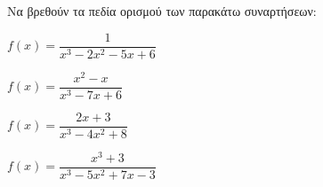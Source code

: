 Να βρεθούν τα πεδία ορισμού των παρακάτω συναρτήσεων:
\begin{alist}
\item $ f(x)=\dfrac{1}{x^3-2x^2-5x+6} $
\item $ f(x)=\dfrac{x^2-x}{x^3-7x+6} $
\item $ f(x)=\dfrac{2x+3}{x^3-4x^2+8} $
\item $ f(x)=\dfrac{x^3+3}{x^3-5x^2+7x-3} $
\end{alist} 

